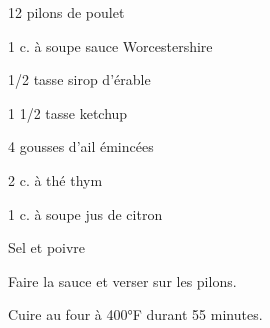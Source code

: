 


\totaltime{}


\begin{ingredients}
    \item 12 pilons de poulet
    \item 1 c. à soupe sauce Worcestershire
    \item 1/2 tasse sirop d'érable
    \item 1 1/2 tasse ketchup
    \item 4 gousses d'ail émincées
    \item 2 c. à thé thym
    \item 1 c. à soupe jus de citron
    \item Sel et poivre
\end{ingredients}

\begin{steps}
    \item Faire la sauce et verser sur les pilons.
    \item Cuire au four à 400°F durant 55 minutes.
\end{steps}
